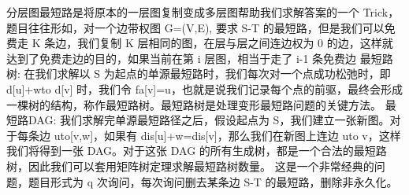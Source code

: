 \markdownRendererInterblockSeparator
{}分层图最短路是将原本的一层图复制变成多层图帮助我们求解答案的一个 \markdownRendererDollarSign{}Trick\markdownRendererDollarSign{}，题目往往形如，对一个边带权图 \markdownRendererDollarSign{}G=(V,E)\markdownRendererDollarSign{}, 要求 \markdownRendererDollarSign{}S-T\markdownRendererDollarSign{} 的最短路，但是我们可以免费走 \markdownRendererDollarSign{}K\markdownRendererDollarSign{} 条边，我们复制 \markdownRendererDollarSign{}K\markdownRendererDollarSign{} 层相同的图，在层与层之间连边权为 \markdownRendererDollarSign{}0\markdownRendererDollarSign{} 的边，这样就达到了免费走边的目的，如果当前在第 \markdownRendererDollarSign{}i\markdownRendererDollarSign{} 层图，相当于走了 \markdownRendererDollarSign{}i-1\markdownRendererDollarSign{} 条免费边\markdownRendererInterblockSeparator
{}
\markdownRendererSectionEnd \markdownRendererSectionBegin
{}\markdownRendererInterblockSeparator
{}最短路树:\markdownRendererParagraphSeparator
{}在我们求解以 \markdownRendererDollarSign{}S\markdownRendererDollarSign{} 为起点的单源最短路时，我们每次对一个点成功松弛时，即 \markdownRendererDollarSign{}d[u]+w\markdownRendererBackslash{}to d[v]\markdownRendererDollarSign{} 时，我们令 \markdownRendererDollarSign{}fa[v]=u\markdownRendererDollarSign{}，也就是说我们记录每个点的前驱，最终会形成一棵树的结构，称作最短路树。最短路树是处理变形最短路问题的关键方法。\markdownRendererParagraphSeparator
{}最短路DAG:\markdownRendererParagraphSeparator
{}我们求解完单源最短路径之后，假设起点为 \markdownRendererDollarSign{}S\markdownRendererDollarSign{}，我们建立一张新图。对于每条边 \markdownRendererDollarSign{}u\markdownRendererBackslash{}to[v,w]\markdownRendererDollarSign{}，如果有 \markdownRendererDollarSign{}dis[u]+w=dis[v]\markdownRendererDollarSign{}，那么我们在新图上连边 \markdownRendererDollarSign{}u\markdownRendererBackslash{}to v\markdownRendererDollarSign{}，这样我们将得到一张 \markdownRendererDollarSign{}DAG\markdownRendererDollarSign{}。对于这张 \markdownRendererDollarSign{}DAG\markdownRendererDollarSign{} 的所有生成树，都是一个合法的最短路树，因此我们可以套用矩阵树定理求解最短路树数量。\markdownRendererInterblockSeparator
{}
\markdownRendererSectionEnd \markdownRendererSectionBegin
{}\markdownRendererInterblockSeparator
{}这是一个非常经典的问题，题目形式为 \markdownRendererDollarSign{}q\markdownRendererDollarSign{} 次询问，每次询问删去某条边 \markdownRendererDollarSign{}S-T\markdownRendererDollarSign{} 的最短路，删除非永久化。\markdownRendererParagraphSeparator
